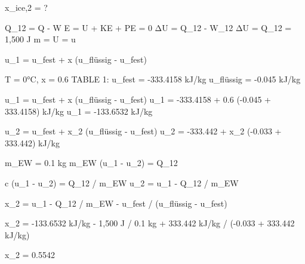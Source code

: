 x_ice,2 = ?  

Q_12 = Q - W  
E = U + KE + PE = 0  
ΔU = Q_12 - W_12  
ΔU = Q_12 = 1,500 J  
m = U = u  

u_1 = u_fest + x (u_flüssig - u_fest)  

T = 0°C, x = 0.6  
TABLE 1:  
u_fest = -333.4158 kJ/kg  
u_flüssig = -0.045 kJ/kg  

u_1 = u_fest + x (u_flüssig - u_fest)  
u_1 = -333.4158 + 0.6 (-0.045 + 333.4158) kJ/kg  
u_1 = -133.6532 kJ/kg  

u_2 = u_fest + x_2 (u_flüssig - u_fest)  
u_2 = -333.442 + x_2 (-0.033 + 333.442) kJ/kg  

m_EW = 0.1 kg  
m_EW (u_1 - u_2) = Q_12  

c (u_1 - u_2) = Q_12 / m_EW  
u_2 = u_1 - Q_12 / m_EW  

x_2 = u_1 - Q_12 / m_EW - u_fest / (u_flüssig - u_fest)  

x_2 = -133.6532 kJ/kg - 1,500 J / 0.1 kg + 333.442 kJ/kg  
/ (-0.033 + 333.442 kJ/kg)  

x_2 = 0.5542